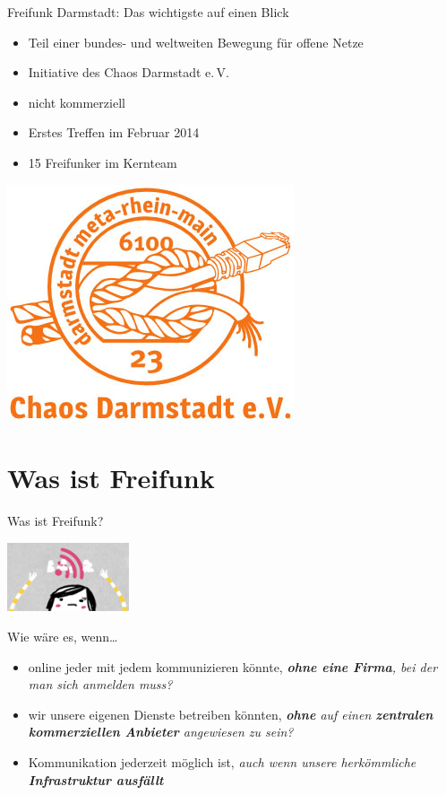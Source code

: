 \documentclass[10pt]{beamer}
\begin{document}
  \begin{frame}{Freifunk Darmstadt: Das wichtigste auf einen Blick}
    \begin{center}
    \begin{itemize}
	  \item Teil einer bundes- und weltweiten Bewegung für offene Netze
	  \item Initiative des Chaos Darmstadt e.\,V.
	  \item nicht kommerziell
	  \item Erstes Treffen im Februar 2014
      \item 15 Freifunker im Kernteam
    \end{itemize}
    \vfill
    \includegraphics[width=.3\textheight]{images/cda}
    \end{center}
  \end{frame}


  \section{Was ist Freifunk}

  \begin{frame}{Was ist Freifunk?}
      \begin{center}
        \includegraphics[width=3.6cm]{images/up}
      \end{center}
      Wie wäre es, wenn\ldots
      \begin{itemize}
        \pause
        \item online jeder mit jedem kommunizieren könnte, \textit{\textbf{ohne eine Firma}, bei der man sich anmelden muss?}
        \pause
        \item wir unsere eigenen Dienste betreiben könnten,  \textit{\textbf{ohne} auf einen \textbf{zentralen kommerziellen Anbieter} angewiesen zu sein?}
        \pause
        \item Kommunikation jederzeit möglich ist, \textit{auch wenn unsere herkömmliche \textbf{Infrastruktur ausfällt}}
      \end{itemize}
    \end{frame}
\end{document}
